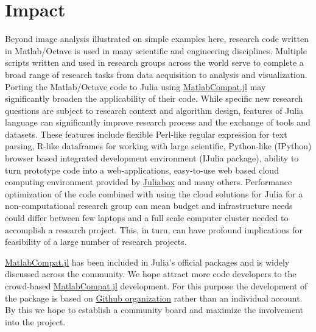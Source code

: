 \section{Impact}

Beyond image analysis illustrated on simple examples here, research code written in Matlab/Octave is used in many scientific and engineering disciplines. Multiple scripts written and used in research groups across the world serve to complete a broad range of research tasks from data acquisition to analysis and visualization. Porting the Matlab/Octave code to Julia using \href{https://github.com/MatlabCompat/MatlabCompat.jl}{MatlabCompat.jl} may significantly broaden the applicability of their code. While specific new research questions are subject to research context and algorithm design, features of Julia language can significantly improve research process and the exchange of tools and datasets. These features include flexible Perl-like regular expression for text parsing, R-like dataframes for working with large scientific, Python-like (IPython) browser based integrated development environment (IJulia package), ability to turn prototype code into a web-applications, easy-to-use web based cloud computing environment provided by \href{https://www.juliabox.org/}{Juliabox} and many others. Performance optimization of the code combined with using the cloud solutions for Julia for a non-computational research group can mean budget and infrastructure needs could differ between few laptops and a full scale computer cluster needed to accomplish a research project. This, in turn, can have profound implications for feasibility of a large number of research projects.

\href{https://github.com/MatlabCompat/MatlabCompat.jl}{MatlabCompat.jl} has been included in Julia's official packages and is widely discussed across the community. We hope attract more code developers to the crowd-based \href{https://github.com/MatlabCompat/MatlabCompat.jl}{MatlabCompat.jl} development. For this purpose the development of the package is based on \href{http://matlabcompat.github.io/}{Github organization} rather than an individual account. By this we hope to establish a community board and maximize the involvement into the project.
  
  